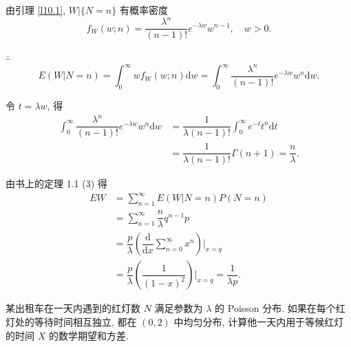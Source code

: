 \documentclass[color=black,device=normal,lang=cn]{elegantnote}
\numberwithin{equation}{section}
\theoremstyle{plain}
\numberwithin{exercise}{exsection}
\begin{document}
\begin{solution}
    由引理 \ref{l10.1}, $W|\{N=n\}$ 有概率密度
    \[f_W(w;n)=\dfrac{\lambda^n}{(n-1)!}e^{-\lambda w}w^{n-1},\quad w>0.\]

    $\therefore$
    \[E(W|N=n)=\int_0^\infty wf_W(w;n)\mathrm{d}w=\int_0^\infty\dfrac{\lambda^n}{(n-1)!}e^{-\lambda w}w^n\mathrm{d}w.\]

    令 $t=\lambda w$, 得
    \begin{align*}
        \int_0^\infty\dfrac{\lambda^n}{(n-1)!}e^{-\lambda w}w^n\mathrm{d}w & =\dfrac{1}{\lambda(n-1)!}\int_0^\infty e^{-t}t^n\mathrm{d}t \\
        & =\dfrac{1}{\lambda(n-1)!}\Gamma(n+1)=\dfrac{n}{\lambda}.
    \end{align*}

    由书上的定理 1.1 (3) 得
    \begin{align*}
        EW & =\sum\limits_{n=1}^\infty E(W|N=n)P(N=n) \\
        & =\sum\limits_{n=1}^\infty\dfrac{n}{\lambda}q^{n-1}p \\
        & =\dfrac{p}{\lambda}\left(\dfrac{\mathrm{d}}{\mathrm{d}x}\sum\limits_{n=0}^\infty x^n\right)\Bigg|_{x=q} \\
        & =\dfrac{p}{\lambda}\left(\dfrac{1}{(1-x)^2}\right)\Bigg|_{x=q}=\dfrac{1}{\lambda p}.
    \end{align*}
\end{solution}
\begin{exercise}%
    某出租车在一天内遇到的红灯数 $N$ 满足参数为 $\lambda$ 的 Poisson 分布. 如果在每个红灯处的等待时间相互独立, 都在 $(0,2)$ 中均匀分布, 计算他一天内用于等候红灯的时间 $X$ 的数学期望和方差.
\end{exercise}
\end{document}
